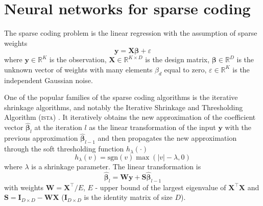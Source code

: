 \documentclass{article}
\begin{document}
\section{Neural networks for sparse coding}
\label{sec:nn_sc}
The sparse coding problem is the linear regression with the assumption of sparse weights
\begin{equation}
\label{eq:regression_problem}
\mathbf{y} = \mathbf{X}\boldsymbol\beta + \varepsilon
\end{equation}
where $\mathbf{y} \in \mathbb{R}^K$ is the observation, $\mathbf{X} \in \mathbb{R}^{K \times D}$ is the design matrix, $\boldsymbol\beta \in \mathbb{R}^D$ is the unknown vector of weights with many elements $\beta_d$ equal to zero, $\varepsilon \in \mathbb{R}^K$ is the independent Gaussian noise.

One of the popular families of the sparse coding algorithms is the iterative shrinkage algorithms, and notably the Iterative Shrinkage and Thresholding Algorithm (\textsc{ista}) \citep{daubechies2004iterative}. It iteratively obtains the new approximation of the coefficient vector $\widehat{\boldsymbol\beta}_l$ at the iteration $l$ as the linear transformation of the input $\mathbf{y}$ with the previous approximation $\widehat{\boldsymbol\beta}_{l-1}$ and then propagates the new approximation through the soft thresholding function $h_\lambda(\cdot)$
\begin{equation}
h_\lambda(v) = \text{sgn}(v) \max(|v| - \lambda, 0)
\end{equation}
where $\lambda$ is a shrinkage parameter.
The linear transformation is
\begin{equation}
\widehat{\boldsymbol\beta}_l = \mathbf{W}\mathbf{y} + \mathbf{S}\widehat{\boldsymbol\beta}_{l-1}
\end{equation}
with weights $\mathbf{W} = \mathbf{X}^\top / E$, $E$ - upper bound of the largest eigenvalue of $\mathbf{X}^\top\mathbf{X}$ and $\mathbf{S} = \mathbf{I}_{D \times D} - \mathbf{W}\mathbf{X}$ ($\mathbf{I}_{D \times D}$ is the identity matrix of size $D$).
\end{document}
